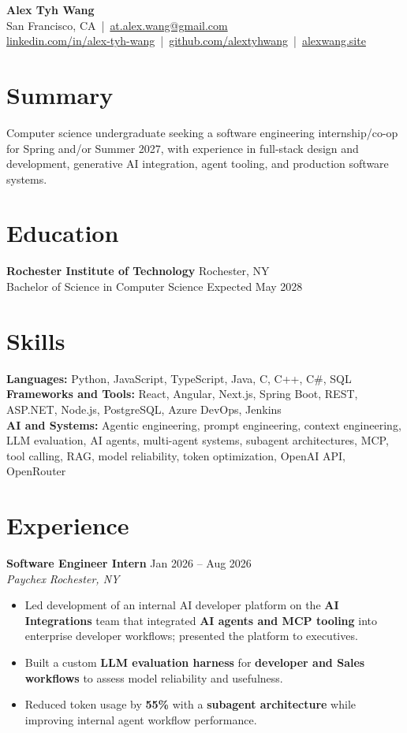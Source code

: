 \documentclass[10pt,letterpaper]{article}
\newif\ifresumeFirstRole
\newcommand{\resumeRole}[4]{%
  \ifresumeFirstRole
    \global\resumeFirstRolefalse
  \else
    \vspace{0pt plus 1fill}%
  \fi
  \textbf{#1} \hfill #2\\
  \textit{#3} \hfill \textit{#4}
}
\begin{document}
\begin{center}
{\Large \textbf{Alex Tyh Wang}}\\
San Francisco, CA \,|\, \href{mailto:at.alex.wang@gmail.com}{at.alex.wang@gmail.com}\\
\small \href{https://www.linkedin.com/in/alex-tyh-wang/}{linkedin.com/in/alex-tyh-wang} \,|\, \href{https://github.com/alextyhwang}{github.com/alextyhwang} \,|\, \href{https://alexwang.site}{alexwang.site}
\end{center}

\section*{Summary}
Computer science undergraduate seeking a software engineering internship/co-op for Spring and/or Summer 2027, with experience in full-stack design and development, generative AI integration, agent tooling, and production software systems.

\section*{Education}
\textbf{Rochester Institute of Technology} \hfill Rochester, NY\\
Bachelor of Science in Computer Science \hfill Expected May 2028

\section*{Skills}
\textbf{Languages:} Python, JavaScript, TypeScript, Java, C, C++, C\#, SQL\\
\textbf{Frameworks and Tools:} React, Angular, Next.js, Spring Boot, REST, ASP.NET, Node.js, PostgreSQL, Azure DevOps, Jenkins\\
\textbf{AI and Systems:} Agentic engineering, prompt engineering, context engineering, LLM evaluation, AI agents, multi-agent systems, subagent architectures, MCP, tool calling, RAG, model reliability, token optimization, OpenAI API, OpenRouter

\section*{Experience}
\resumeRole{Software Engineer Intern}{Jan 2026 -- Aug 2026}{Paychex}{Rochester, NY}
\begin{itemize}
  \item Led development of an internal AI developer platform on the \textbf{AI Integrations} team that integrated \textbf{AI agents and MCP tooling} into enterprise developer workflows; presented the platform to executives.
  \item Built a custom \textbf{LLM evaluation harness} for \textbf{developer and Sales workflows} to assess model reliability and usefulness.
  \item Reduced token usage by \textbf{55\%} with a \textbf{subagent architecture} while improving internal agent workflow performance.
\end{itemize}
\end{document}
